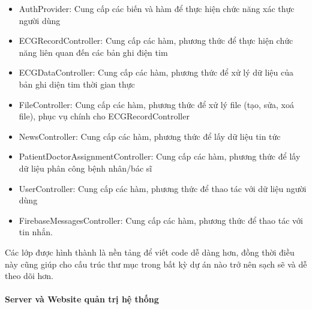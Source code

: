 \begin{enumerate}[a)]
  \begin{itemize}
    \item AuthProvider: Cung cấp các biến và hàm để thực hiện chức năng xác thực người dùng
    \item ECGRecordController: Cung cấp các hàm, phương thức để thực hiện chức năng liên quan đến các bản ghi điện tim
    \item ECGDataController: Cung cấp các hàm, phương thức để xử lý dữ liệu của bản ghi diện tim thời gian thực
    \item FileController: Cung cấp các hàm, phương thức để xử lý file (tạo, sửa, xoá file), phục vụ chính cho ECGRecordController  
    \item NewsController: Cung cấp các hàm, phương thức để lấy dữ liệu tin tức
    \item PatientDoctorAssignmentController: Cung cấp các hàm, phương thức để lấy dữ liệu phân công bệnh nhân/bác sĩ
    \item UserController: Cung cấp các hàm, phương thức để thao tác với dữ liệu người dùng 
    \item FirebaseMessagesController: Cung cấp các hàm, phương thức để thao tác với tin nhắn.
  \end{itemize}

  Các lớp được hình thành là nền tảng để viết code dễ dàng hơn, đồng thời điều này cũng giúp cho cấu trúc thư mục trong
  bất kỳ dự án nào trở nên sạch sẽ và dễ theo dõi hơn.
  
  \end{enumerate}

\paragraph{Server và Website quản trị hệ thống}
\mbox{}

